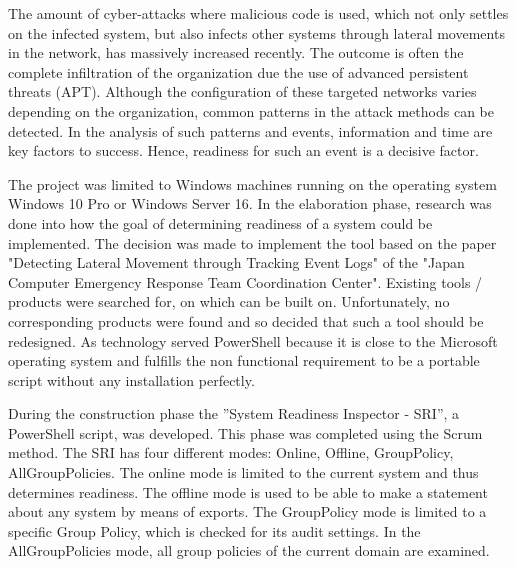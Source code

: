 
\thispagestyle{plain}
\renewcommand\section{\stdsection}
The amount of cyber-attacks where malicious code is used, which not only settles on the infected system, but also infects other systems through lateral movements in the network, has massively increased recently. The outcome is often the complete infiltration of the organization due the use of advanced persistent threats (APT). Although the configuration of these targeted networks varies depending on the organization, common patterns in the attack methods can be detected. In the analysis of such patterns and events, information and time are key factors to success. Hence, readiness for such an event is a decisive factor.

The project was limited to Windows machines running on the operating system Windows 10 Pro or Windows Server 16. In the elaboration phase, research was done into how the goal of determining readiness of a system could be implemented. The decision was made to implement the tool based on the paper "Detecting Lateral Movement through Tracking Event Logs" of the "Japan Computer Emergency Response Team Coordination Center". Existing tools / products were searched for, on which can be built on. Unfortunately, no corresponding products were found and so decided that such a tool should be redesigned. As technology served PowerShell because it is close to the Microsoft operating system and fulfills the non functional requirement to be a portable script without any installation perfectly.


During the construction phase the ''System Readiness Inspector - SRI'', a PowerShell script, was developed. This phase was completed using the Scrum method. The SRI has four different modes: Online, Offline, GroupPolicy, AllGroupPolicies. The online mode is limited to the current system and thus determines readiness. The offline mode is used to be able to make a statement about any system by means of exports. The GroupPolicy mode is limited to a specific Group Policy, which is checked for its audit settings. In the AllGroupPolicies mode, all group policies of the current domain are examined. 
\thispagestyle{plain}